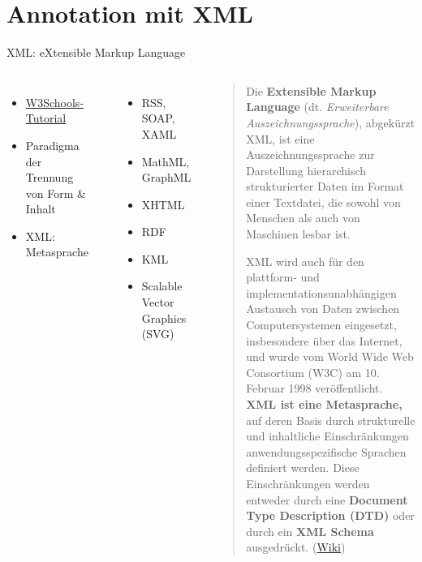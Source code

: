 \section{Annotation mit XML}
\begin{frame}{XML: eXtensible Markup Language}
\begin{columns}
\begin{itemize}\small 
    \item \href{https://www.w3schools.com/xml/default.asp}{W3Schools-Tutorial} 
    \item {Paradigma der Trennung von Form \& Inhalt} 
    \item {XML: Metasprache}
\end{itemize}
 \\

\begin{itemize}\scriptsize 
    \item {RSS}, SOAP, XAML 
    \item {MathML}, {GraphML}~ 
    \item {XHTML}~
    \item {RDF}~
    \item {KML}~ 
    \item {Scalable Vector Graphics (SVG)}
\end{itemize}

\begin{block}{}
\begin{quote}
    Die \textbf{Extensible Markup Language} (dt. \emph{Erweiterbare Auszeichnungssprache}), abgekürzt XML, ist eine Auszeichnungssprache zur Darstellung hierarchisch strukturierter Daten im Format einer Textdatei, die sowohl von Menschen als auch von Maschinen lesbar ist.

XML wird auch für den plattform- und implementationsunabhängigen Austausch von Daten zwischen Computersystemen eingesetzt, insbesondere über das Internet, und wurde vom World Wide Web Consortium (W3C) am 10. Februar 1998 veröffentlicht. \punkti \textbf{XML ist eine Metasprache,} auf deren Basis durch strukturelle und inhaltliche Einschränkungen anwendungsspezifische Sprachen definiert werden. Diese Einschränkungen werden entweder durch eine \textbf{Document Type Description (DTD)} oder durch ein \textbf{XML Schema} ausgedrückt.  (\href{https://de.wikipedia.org/wiki/Extensible\_Markup\_Language}{Wiki})
\end{quote}
\end{block}
\end{columns}

\end{frame}

